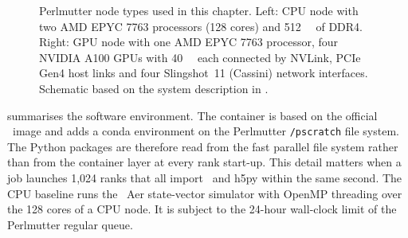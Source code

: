 \begin{figure}[htbp]
\caption{Perlmutter node types used in this chapter. Left: CPU node with two AMD EPYC 7763 processors (128 cores) and \SI{512}{\giga\byte} of DDR4. Right: GPU node with one AMD EPYC 7763 processor, four NVIDIA A100 GPUs with \SI{40}{\giga\byte} each connected by NVLink, PCIe Gen4 host links and four Slingshot~11 (Cassini) network interfaces. Schematic based on the system description in \cite{guo2025qgear}.}
\label{fig:qgear:perlmutter}
\end{figure}

 summarises the software environment. The container is based on the official \cudaq\ image and adds a conda environment on the Perlmutter \texttt{/pscratch} file system. The Python packages are therefore read from the fast parallel file system rather than from the container layer at every rank start-up. This detail matters when a job launches 1,024 ranks that all import \qiskit\ and h5py within the same second. The CPU baseline runs the \qiskit\ Aer state-vector simulator with OpenMP threading over the 128 cores of a CPU node. It is subject to the 24-hour wall-clock limit of the Perlmutter regular queue.

